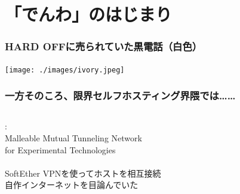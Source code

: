 \documentclass[
  lualatex,
  aspectratio=169,
  14pt
]{beamer}
\begin{document}
\section{「でんわ」のはじまり}

\begin{frame}
  \frametitle{HARD OFFに売られていた黒電話（白色）}

  \centering
  \texttt{[image: ./images/ivory.jpeg]}
\end{frame}

\begin{frame}
  \frametitle{一方そのころ、限界セルフホスティング界隈では……}

  \begin{columns}[c]
    \begin{column}[c]{.80\textwidth}
      :\\
      \hspace{1.5\zw}Malleable Mutual Tunneling Network\\
      \hspace{1.5\zw}for Experimental Technologies
      \\~\\[-.5\baselineskip]

      SoftEther VPNを使ってホストを相互接続\\
      \hspace{1.5\zw}自作インターネットを目論んでいた
      \\~\\[-.5\baselineskip]


\end{column}
\end{columns}
\end{frame}
\end{document}
